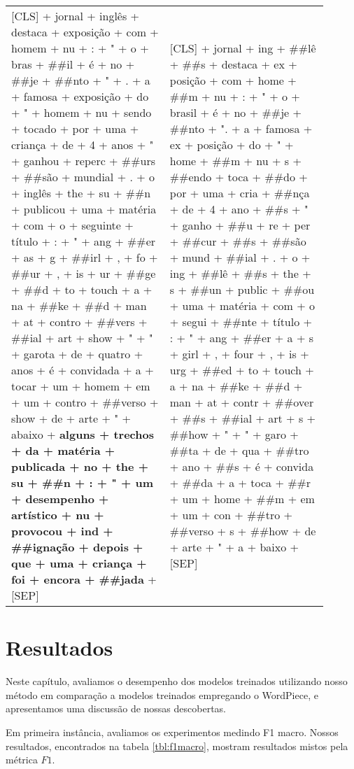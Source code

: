 \documentclass[cic,tc]{iiufrgs}
\begin{document}
\begin{table}[h]
\begin{tabular}{p{0.45\linewidth} | p{0.45\linewidth}}
{[}CLS{]} + jornal + inglês + destaca + exposição + com + homem + nu + : + " + o + bras + \#\#il + é + no + \#\#je + \#\#nto + " + . + a + famosa + exposição + do + " + homem + nu + sendo + tocado + por + uma + criança + de + 4 + anos + " + ganhou + reperc + \#\#urs + \#\#são + mundial + . + o + inglês + the + su + \#\#n + publicou + uma + matéria + com + o + seguinte + título + : + " + ang + \#\#er + as + g + \#\#irl + , + fo + \#\#ur + , + is + ur + \#\#ge + \#\#d + to + touch + a + na + \#\#ke + \#\#d + man + at + contro + \#\#vers + \#\#ial + art + show + " + " + garota + de + quatro + anos + é + convidada + a + tocar + um + homem + em + um + contro + \#\#verso + show + de + arte + " + abaixo + \textbf{alguns + trechos + da + matéria + publicada + no + the + su + \#\#n + : + " + um + desempenho + artístico + nu + provocou + ind + \#\#ignação + depois + que + uma + criança + foi + encora + \#\#jada} + {[}SEP{]} & {[}CLS{]} + jornal + ing + \#\#lê + \#\#s + destaca + ex + posição + com + home + \#\#m + nu + : + " + o + brasil + é + no + \#\#je + \#\#nto + ". + a + famosa + ex + posição + do + " + home + \#\#m + nu + s + \#\#endo + toca + \#\#do + por + uma + cria + \#\#nça + de + 4 + ano + \#\#s + " + ganho + \#\#u + re + per + \#\#cur + \#\#s + \#\#são + mund + \#\#ial + . + o + ing + \#\#lê + \#\#s + the + s + \#\#un + public + \#\#ou + uma + matéria + com + o + segui + \#\#nte + título + : + " + ang + \#\#er + a + s + girl + , + four + , + is + urg + \#\#ed + to + touch + a + na + \#\#ke + \#\#d + man + at + contr + \#\#over + \#\#s + \#\#ial + art + s + \#\#how + " + " + garo + \#\#ta + de + qua + \#\#tro + ano + \#\#s + é + convida + \#\#da + a + toca + \#\#r + um + home + \#\#m + em + um + con + \#\#tro + \#\#verso + s + \#\#how + de + arte + " + a + baixo + {[}SEP{]}
\end{tabular}
\label{tbl:trunc}
\end{table}


\chapter{Resultados}
Neste capítulo, avaliamos o desempenho dos modelos treinados utilizando nosso método em comparação a modelos treinados empregando o WordPiece, e apresentamos uma discussão de nossas descobertas.

Em primeira instância, avaliamos os experimentos medindo F1 macro. Nossos resultados, encontrados na tabela \ref{tbl:f1macro}, mostram resultados mistos pela métrica $F1$.
\end{document}
